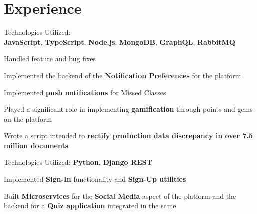 \documentclass[]{deedy-resume-openfont}
\begin{document}
\begin{minipage}[t]{0.33\textwidth}

%
%

\end{minipage} 
\hfill
\begin{minipage}[t]{0.66\textwidth} 


\section{Experience}

\sectionsep

\sectionsep
\begin{tightemize}
\item Technologies Utilized: \\\textbf{JavaScript}, \textbf{TypeScript}, \textbf{Node.js}, \textbf{MongoDB}, \textbf{GraphQL}, \textbf{RabbitMQ}
\item Handled feature and bug fixes
\item Implemented the backend of the \textbf{Notification Preferences} for the platform
\item Implemented \textbf{push notifications} for Missed Classes
\item Played a significant role in implementing \textbf{gamification} through points and gems on the platform
\item Wrote a script intended to \textbf{rectify production data discrepancy in over 7.5 million documents}
\end{tightemize}

\begin{tightemize}
\item Technologies Utilized: \textbf{Python}, \textbf{Django REST}
\item Implemented \textbf{Sign-In} functionality and \textbf{Sign-Up utilities}
\item Built \textbf{Microservices} for the \textbf{Social Media} aspect of the platform and the backend for a \textbf{Quiz application} integrated in the same
\end{tightemize}


\end{minipage}
\end{document}
